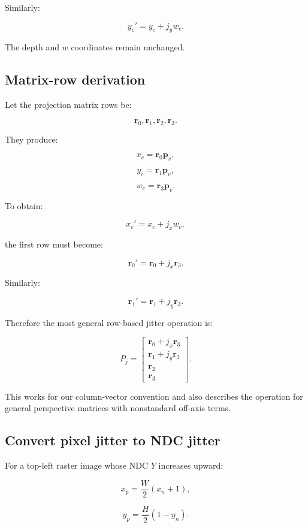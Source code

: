 Similarly:

\[
 \boxed{y_c'=y_c+j_yw_c}.
\]

The depth and \(w\) coordinates remain unchanged.

\subsection{Matrix-row derivation}\label{02-foundations-ii-ch036-matrix-row-derivation}

Let the projection matrix rows be:

\[
 \mathbf r_0,\mathbf r_1,\mathbf r_2,\mathbf r_3.
\]

They produce:

\[
 x_c=\mathbf r_0\mathbf p_v,
\]

\[
 y_c=\mathbf r_1\mathbf p_v,
\]

\[
 w_c=\mathbf r_3\mathbf p_v.
\]

To obtain:

\[
 x_c'=x_c+j_xw_c,
\]

the first row must become:

\[
 \boxed{ \mathbf r_0'=\mathbf r_0+j_x\mathbf r_3 }.
\]

Similarly:

\[
 \boxed{ \mathbf r_1'=\mathbf r_1+j_y\mathbf r_3 }.
\]

Therefore the most general row-based jitter operation is:

\[
 \boxed{ P_j= \begin{bmatrix} \mathbf r_0+j_x\mathbf r_3\\ \mathbf r_1+j_y\mathbf r_3\\ \mathbf r_2\\ \mathbf r_3 \end{bmatrix} }.
\]

This works for our column-vector convention and also describes the operation for general perspective matrices with nonstandard off-axis terms.

\subsection{Convert pixel jitter to NDC jitter}\label{02-foundations-ii-ch036-convert-pixel-jitter-to-ndc-jitter}

For a top-left raster image whose NDC \(Y\) increases upward:

\[
 x_p=\frac{W}{2}(x_n+1),
\]

\[
 y_p=\frac{H}{2}(1-y_n).
\]

